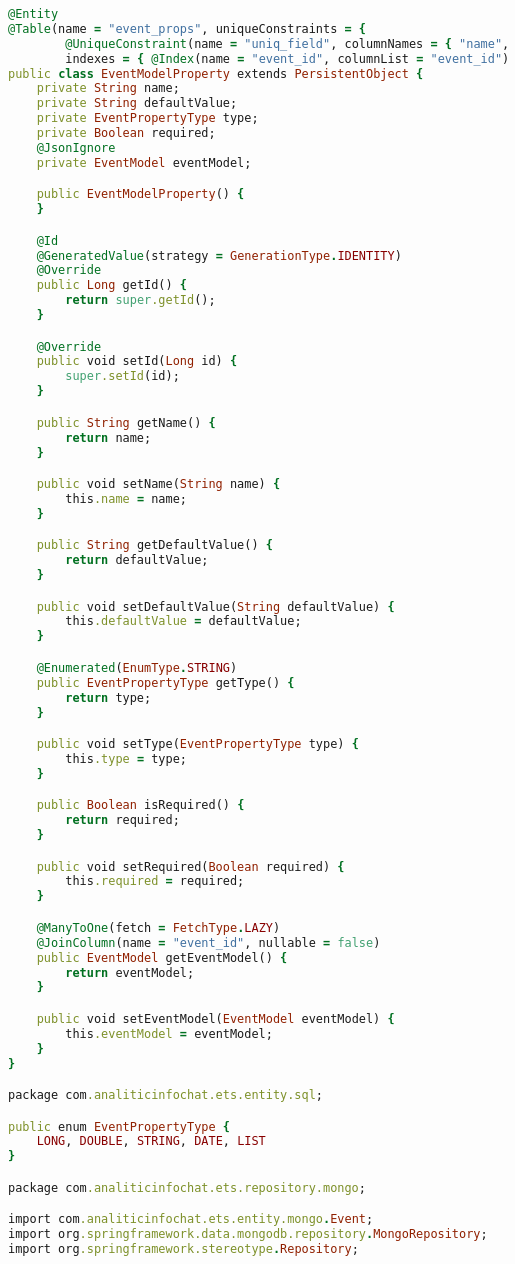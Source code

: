 \begin{lstlisting}[language=Ruby, style=rubystyle]
@Entity
@Table(name = "event_props", uniqueConstraints = {
        @UniqueConstraint(name = "uniq_field", columnNames = { "name", "event_id" }) },
        indexes = { @Index(name = "event_id", columnList = "event_id") })
public class EventModelProperty extends PersistentObject {
    private String name;
    private String defaultValue;
    private EventPropertyType type;
    private Boolean required;
    @JsonIgnore
    private EventModel eventModel;

    public EventModelProperty() {
    }

    @Id
    @GeneratedValue(strategy = GenerationType.IDENTITY)
    @Override
    public Long getId() {
        return super.getId();
    }

    @Override
    public void setId(Long id) {
        super.setId(id);
    }

    public String getName() {
        return name;
    }

    public void setName(String name) {
        this.name = name;
    }

    public String getDefaultValue() {
        return defaultValue;
    }

    public void setDefaultValue(String defaultValue) {
        this.defaultValue = defaultValue;
    }

    @Enumerated(EnumType.STRING)
    public EventPropertyType getType() {
        return type;
    }

    public void setType(EventPropertyType type) {
        this.type = type;
    }

    public Boolean isRequired() {
        return required;
    }

    public void setRequired(Boolean required) {
        this.required = required;
    }

    @ManyToOne(fetch = FetchType.LAZY)
    @JoinColumn(name = "event_id", nullable = false)
    public EventModel getEventModel() {
        return eventModel;
    }

    public void setEventModel(EventModel eventModel) {
        this.eventModel = eventModel;
    }
}

package com.analiticinfochat.ets.entity.sql;

public enum EventPropertyType {
    LONG, DOUBLE, STRING, DATE, LIST
}

package com.analiticinfochat.ets.repository.mongo;

import com.analiticinfochat.ets.entity.mongo.Event;
import org.springframework.data.mongodb.repository.MongoRepository;
import org.springframework.stereotype.Repository;


\end{lstlisting}
